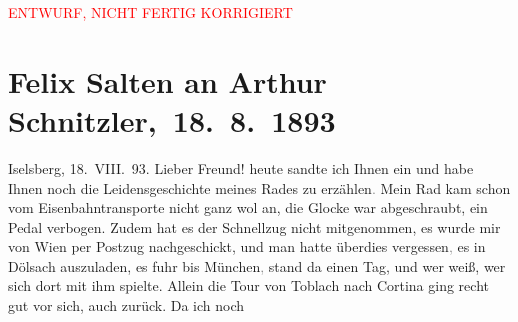 
\begin{center}
            \textcolor{red}{ENTWURF, NICHT FERTIG KORRIGIERT}
                      \end{center}
            
         
         \renewcommand{\erwaehntePersonen}{Personen: Franz Defregger, Marie Glümer, Felix Salten, Michael Emil Salzmann, Philipp Salzmann, Theodor Salzmann, Hermine von Schaffgotsch, Josefine Lydia von Weisswasser}
         \renewcommand{\erwaehnteOrte}{Orte: Ampezzo, Cortina d'Ampezzo, Dölsach, Großglockner, Heiligenblut am Großglockner, Iselsberg, Kaiser-Franz-Josefs-Höhe, Lienz, Mittewald an der Drau, München, Pasterze Glacier, Toblach, Wien}
         \renewcommand{\erwaehnteWerke}{}
               \section[ Felix Salten an Arthur Schnitzler, 18. 8. 1893]{ Felix Salten an Arthur Schnitzler, 18. 8. 1893}\nopagebreak{}\rehead{ }\begin{ledgroupsized}[t]{13cm}\normalsize\beginnumbering \toendnotes[C]{\smallbreak\pagebreak[2]} 
\toendnotes[C]{\smallbreak}\pstart
           \raggedleft{}{\pb}Iselsberg, 18. VIII. 93.\pend
           \pstart
           Lieber Freund!{ }heute sandte ich Ihnen ein \label{K_L03128-1v}\label{K_L03128-1h} und habe Ihnen noch die Leidensgeschichte meines Rades zu
                  erzählen\textcolor{gray}{.} Mein Rad kam schon vom Eisenbahntransporte nicht ganz
               wol an, die Glocke war abgeschraubt, ein Pedal verbogen. Zudem hat es der Schnellzug
               nicht mitgenommen, es wurde mir von Wien per
               Postzug nachgeschickt, und man hatte überdies vergessen\textcolor{gray}{,} es in Dölsach auszuladen, es fuhr bis München\textcolor{gray}{,} stand da einen Tag, und wer weiß, wer sich dort mit ihm spielte.
               Allein die Tour von Toblach nach Cortina ging recht gut vor sich, auch zurück. Da ich noch

\end{ledgroupsized}
